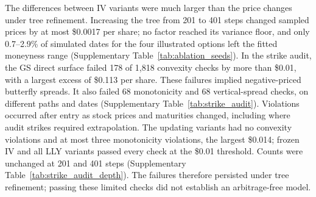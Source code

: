 The differences between IV variants were much larger than the price changes under tree refinement. Increasing the tree from 201 to 401 steps changed sampled prices by at most \$0.0017 per share; no factor reached its variance floor, and only 0.7--2.9\% of simulated dates for the four illustrated options left the fitted moneyness range (Supplementary Table~\ref{tab:ablation_seeds}). In the strike audit, the GS direct surface failed 178 of 1{,}818 convexity checks by more than \$0.01, with a largest excess of \$0.113 per share. These failures implied negative-priced butterfly spreads. It also failed 68 monotonicity and 68 vertical-spread checks, on different paths and dates (Supplementary Table~\ref{tab:strike_audit}). Violations occurred after entry as stock prices and maturities changed, including where audit strikes required extrapolation. The updating variants had no convexity violations and at most three monotonicity violations, the largest \$0.014; frozen IV and all LLY variants passed every check at the \$0.01 threshold. Counts were unchanged at 201 and 401 steps (Supplementary Table~\ref{tab:strike_audit_depth}). The failures therefore persisted under tree refinement; passing these limited checks did not establish an arbitrage-free model.

\FloatBarrier
